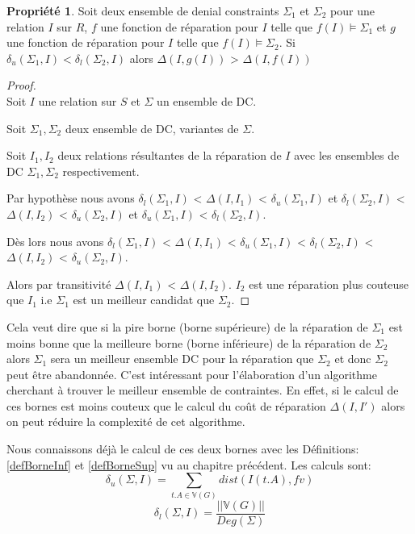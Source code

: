 \documentclass[letterpaper, 12pt]{report}
\theoremstyle{definition}
\newtheorem{myprop}{Propriété}
\newcommand{\V}{\mathbb{V}}
\begin{document}
\begin{myprop}
\label{boundRemove}
	Soit deux ensemble de denial constraints $\Sigma_1$ et $\Sigma_2$ pour une relation $I$ sur $R$, $f$ une fonction de réparation pour $I$ telle que $f(I)\models \Sigma_1$ et  $g$ une fonction de réparation pour $I$ telle que $f(I)\models \Sigma_2$. Si $\delta_u(\Sigma_1,I) < \delta_l(\Sigma_2,I)$ alors $\Delta(I,g(I))$ > $\Delta(I,f(I))$
\end{myprop}


\begin{proof}~\\
\hspace*{0.5cm} Soit $I$ une relation sur $S$ et $\Sigma$ un ensemble de DC.

Soit $\Sigma_1 , \Sigma_2$ deux ensemble de DC, variantes de $\Sigma$.

Soit $I_1 , I_2$ deux relations résultantes de la réparation de $I$ avec les ensembles de DC $\Sigma_1, \Sigma_2$ respectivement.

Par hypothèse nous avons $\delta_l(\Sigma_1,I)$ < $\Delta(I,I_1)$ < $\delta_u(\Sigma_1,I)$ et $\delta_l(\Sigma_2,I)$ < $\Delta(I,I_2)$ < $\delta_u(\Sigma_2,I)$ et $\delta_u(\Sigma_1,I)$ < $\delta_l(\Sigma_2,I)$.

Dès lors nous avons $\delta_l(\Sigma_1,I)$ < $\Delta(I,I_1)$ < $\delta_u(\Sigma_1,I)$ < $\delta_l(\Sigma_2,I)$ < $\Delta(I,I_2)$ < $\delta_u(\Sigma_2,I)$.

Alors par transitivité  $\Delta(I,I_1)$ < $\Delta(I,I_2)$. $I_2$ est une réparation plus couteuse que $I_1$ i.e $\Sigma_1$ est un meilleur candidat que $\Sigma_2$.
\end{proof}

Cela veut dire que si la pire borne (borne supérieure) de la réparation de $\Sigma_1$ est moins bonne que la meilleure borne (borne inférieure) de la réparation de $\Sigma_2$ alors $\Sigma_1$ sera un meilleur ensemble DC pour la réparation que $\Sigma_2$ et donc $\Sigma_2$ peut être abandonnée. C'est intéressant pour l'élaboration d'un algorithme cherchant à trouver le meilleur ensemble de contraintes. En effet, si le calcul de ces bornes est moins couteux que le calcul du coût de réparation $\Delta(I,I')$ alors on peut réduire la complexité de cet algorithme.

Nous connaissons déjà le calcul de ces deux bornes avec les Définitions: \ref{defBorneInf} et \ref{defBorneSup} vu au chapitre précédent. Les calculs sont:
$$\delta_u(\Sigma,I) = \sum_{t.A \in \mathbb{V}(G)} dist(I(t.A),fv)$$
$$\delta_l(\Sigma,I) = \frac{||\V(G)||}{Deg(\Sigma)} $$
\end{document}
